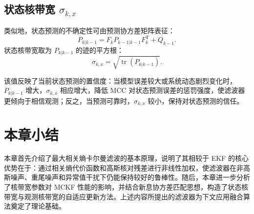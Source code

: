 \subsection{状态核带宽 $\sigma_{k,x}$}

类似地，状态预测的不确定性可由预测协方差矩阵表征：
\begin{equation}
    P_{k|k-1} = F_k P_{k-1|k-1} F_k^{\mathrm{T}} + Q_{k-1}.
    \label{eq:adaptive_state_pred_cov}
\end{equation}
状态核带宽取为 \(P_{k|k-1}\) 的迹的平方根：
\begin{equation}
    \sigma_{k,x} = \sqrt{\operatorname{tr}(P_{k|k-1})}.
    \label{eq:adaptive_sigma_x}
\end{equation}

该值反映了当前状态预测的置信度：当模型误差较大或系统动态剧烈变化时，\(P_{k|k-1}\) 增大，\(\sigma_{k,x}\) 相应增大，降低 MCC 对状态预测误差的惩罚强度，使滤波器更倾向于相信观测；反之，当预测可靠时，\(\sigma_{k,x}\) 较小，保持对状态预测的信任。

\section{本章小结}

本章首先介绍了最大相关熵卡尔曼滤波的基本原理，说明了其相较于 EKF 的核心优势在于：通过相关熵代价函数和高斯核对残差进行非线性加权，使滤波器在非高斯噪声、重尾噪声和异常值干扰下仍能保持较好的鲁棒性\cite{izanloo2016kalman,xie2025adaptive}。随后，本章进一步分析了核带宽参数对 MCKF 性能的影响，并结合新息协方差匹配思想，构造了状态核带宽与观测核带宽的自适应更新方法。上述内容所提出的滤波器为下文应用融合算法奠定了理论基础。
